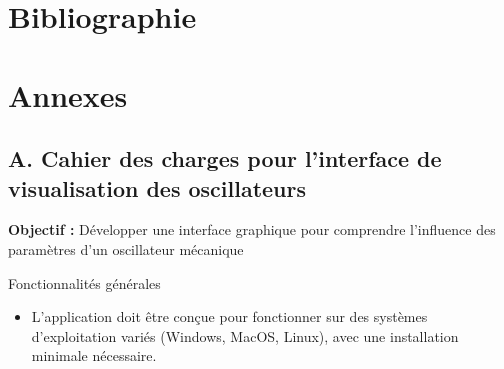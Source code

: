 \documentclass[a4paper, french, 12pt, titlepage]{article}
\begin{document}

\section{Bibliographie}







\newpage

\listoffigures

\newpage

\section{Annexes}

\subsection*{A. Cahier des charges pour l'interface de visualisation des oscillateurs}


\textbf{Objectif :} Développer une interface graphique pour comprendre l'influence des paramètres d'un oscillateur mécanique

\large{Fonctionnalités générales}
\begin{itemize}
  \item L'application doit être conçue pour fonctionner sur des systèmes d'exploitation variés (Windows, MacOS, Linux), avec une installation minimale nécessaire.
\end{itemize}
\end{document}
